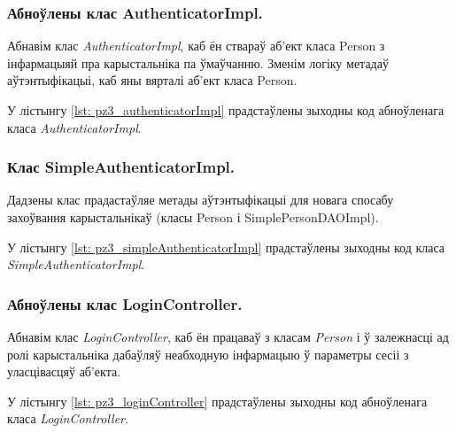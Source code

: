 

\subsubsection{Абноўлены клас AuthenticatorImpl.}

Абнавім клас \textit{AuthenticatorImpl}, каб ён ствараў аб'ект
класа Person з інфармацыяй пра карыстальніка па ўмаўчанню.
Зменім логіку метадаў аўтэнтыфікацыі, каб яны вярталі аб'ект
класа Person.

У лістынгу \ref{lst: pz3_authenticatorImpl} прадстаўлены зыходны код абноўленага класа \textit{AuthenticatorImpl}.



\subsubsection{Клас SimpleAuthenticatorImpl.}

Дадзены клас прадастаўляе метады аўтэнтыфікацыі для новага спосабу
захоўвання карыстальнікаў (класы Person і SimplePersonDAOImpl).


У лістынгу \ref{lst: pz3_simpleAuthenticatorImpl} прадстаўлены зыходны код класа \textit{SimpleAuthenticatorImpl}.



\subsubsection{Абноўлены клас LoginController.}

Абнавім клас \textit{LoginController}, каб ён працаваў з класам
\textit{Person} і ў залежнасці ад ролі карыстальніка дабаўляў
неабходную інфармацыю ў параметры сесіі з уласцівасцяў аб'екта.

У лістынгу \ref{lst: pz3_loginController} прадстаўлены зыходны код абноўленага класа \textit{LoginController}.



